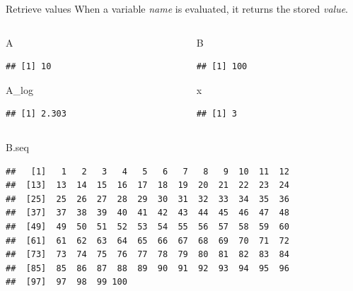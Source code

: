 \documentclass[
  ignorenonframetext,
]{beamer}
\newenvironment{Shaded}{\begin{snugshade}}{\end{snugshade}}
\newcommand{\NormalTok}[1]{#1}
\begin{document}
\begin{frame}[fragile]{Retrieve values}
\protect\hypertarget{retrieve-values}{}
When a variable \emph{name} is evaluated, it returns the stored
\emph{value}.

\begin{columns}[T]
\begin{column}{0.5\textwidth}
\begin{Shaded}
\begin{Highlighting}[]
\NormalTok{A}
\end{Highlighting}
\end{Shaded}

\begin{verbatim}
## [1] 10
\end{verbatim}

\begin{Shaded}
\begin{Highlighting}[]
\NormalTok{A\_log}
\end{Highlighting}
\end{Shaded}

\begin{verbatim}
## [1] 2.303
\end{verbatim}
\end{column}

\begin{column}{0.5\textwidth}
\begin{Shaded}
\begin{Highlighting}[]
\NormalTok{B}
\end{Highlighting}
\end{Shaded}

\begin{verbatim}
## [1] 100
\end{verbatim}

\begin{Shaded}
\begin{Highlighting}[]
\NormalTok{x}
\end{Highlighting}
\end{Shaded}

\begin{verbatim}
## [1] 3
\end{verbatim}
\end{column}
\end{columns}

\begin{Shaded}
\begin{Highlighting}[]
\NormalTok{B.seq}
\end{Highlighting}
\end{Shaded}

\begin{verbatim}
##   [1]   1   2   3   4   5   6   7   8   9  10  11  12
##  [13]  13  14  15  16  17  18  19  20  21  22  23  24
##  [25]  25  26  27  28  29  30  31  32  33  34  35  36
##  [37]  37  38  39  40  41  42  43  44  45  46  47  48
##  [49]  49  50  51  52  53  54  55  56  57  58  59  60
##  [61]  61  62  63  64  65  66  67  68  69  70  71  72
##  [73]  73  74  75  76  77  78  79  80  81  82  83  84
##  [85]  85  86  87  88  89  90  91  92  93  94  95  96
##  [97]  97  98  99 100
\end{verbatim}
\end{frame}
\end{document}
